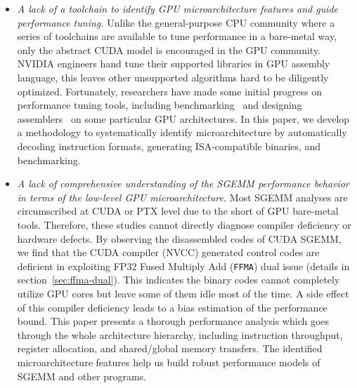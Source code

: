 \begin{itemize}
\item {\em A lack of a toolchain to identify GPU microarchitecture features and guide performance tuning.}
  Unlike the general-purpose CPU community where a series of toolchains are available to tune performance in a bare-metal
  way, only the abstract CUDA model is encouraged in the GPU community. 
  NVIDIA engineers hand tune their supported %
  libraries in GPU assembly language, this leaves other unsupported algorithms hard to be diligently optimized.
  Fortunately, researchers have made some initial progress on performance tuning tools, including benchmarking~\cite{mei, volkov, wong} and designing assemblers~\cite{asfermi,bernstein2012usable,decuda,maxas} on some particular GPU architectures.
In this paper, we develop a methodology to systematically identify 
microarchitecture by automatically decoding instruction formats, generating ISA-compatible binaries, and benchmarking.
\item {\em A lack of comprehensive understanding of the SGEMM performance behavior in terms of the low-level GPU microarchitecture.} 
Most SGEMM analyses are circumscribed at CUDA or PTX level due to the short of GPU bare-metal tools. 
Therefore, these studies cannot directly diagnose compiler deficiency or hardware 
defects. 
By observing the disassembled codes of CUDA SGEMM, we find that the CUDA compiler (NVCC) generated control codes are deficient in exploiting FP32 Fused Multiply Add ({\tt FFMA}) dual issue (details in section~\ref{sec:ffma-dual}). 
This indicates the binary codes cannot completely utilize GPU cores but leave some of them idle most of the time. 
A side effect of this compiler deficiency leads to a bias estimation of the performance bound. 
This paper presents a thorough performance analysis which goes through the whole architecture hierarchy, including instruction 
throughput, register allocation, and shared/global memory transfers. 
The identified microarchitecture features help us build robust performance models of SGEMM and other programs.
\end{itemize}

